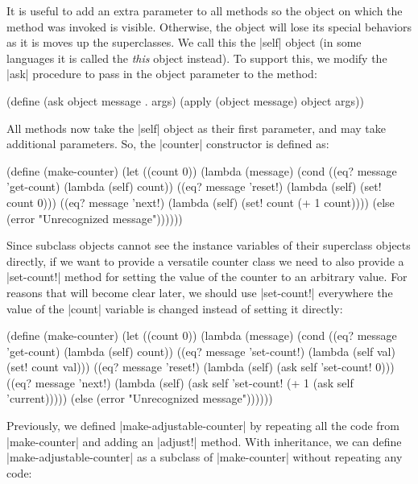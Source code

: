 \begin{schemeregion}
 It is useful to add an extra parameter to all methods so the object on which the method was invoked is visible.  Otherwise, the object will lose its special behaviors as it is moves up the superclasses.  We call this the \scheme|self| object (in some languages it is called the \emph{this} object instead).  To support this, we modify the \scheme|ask| procedure to pass in the object parameter to the method:
\begin{schemedisplay}
(define (ask object message . args)
  (apply (object message) object args))
\end{schemedisplay}

All methods now take the \scheme|self| object as their first parameter, and may take additional parameters.  So, the \scheme|counter| constructor is defined as:
\begin{schemedisplay}
(define (make-counter)
  (let ((count 0))
    (lambda (message)
      (cond 
       ((eq? message 'get-count) (lambda (self) count))           
       ((eq? message 'reset!) (lambda (self) (set! count 0)))
       ((eq? message 'next!) (lambda (self) (set! count (+ 1 count))))           
       (else (error "Unrecognized message"))))))
\end{schemedisplay}          

 Since subclass objects cannot see the instance variables of their superclass objects directly, if we want to provide a versatile counter class we need to also provide a \scheme|set-count!| method for setting the value of the counter to an arbitrary value.  For reasons that will become clear later, we should use \scheme|set-count!| everywhere the value of the \scheme|count| variable is changed instead of setting it directly:
\begin{schemedisplay}
(define (make-counter)
  (let ((count 0))
    (lambda (message)
      (cond 
       ((eq? message 'get-count) (lambda (self) count))
       ((eq? message 'set-count!) (lambda (self val) (set! count val)))       
       ((eq? message 'reset!) (lambda (self) (ask self 'set-count! 0)))
       ((eq? message 'next!)   
        (lambda (self) (ask self 'set-count! (+ 1 (ask self 'current)))))
       (else (error "Unrecognized message"))))))
\end{schemedisplay}          

Previously, we defined \scheme|make-adjustable-counter| by repeating all the code from \scheme|make-counter| and adding an \scheme|adjust!| method.  With inheritance, we can define \scheme|make-adjustable-counter| as a subclass of \scheme|make-counter| without repeating any code:


\end{schemeregion}
